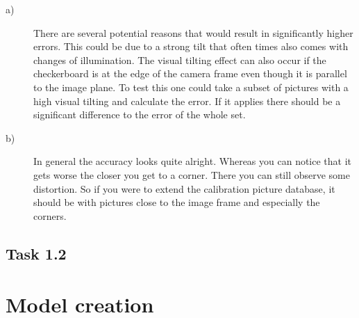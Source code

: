 \documentclass[a4paper]{article} %
\begin{document}
    \begin{description}
        \item [a)] There are several potential reasons that would result in significantly higher errors.
                This could be due to a strong tilt that often times also comes with changes of illumination.
                The visual tilting effect can also occur if the checkerboard is at the edge of the camera frame even though it is parallel to the image plane.
                To test this one could take a subset of pictures with a high visual tilting and calculate the error.
                If it applies there should be a significant difference to the error of the whole set.
        \item [b)] In general the accuracy looks quite alright.
                Whereas you can notice that it gets worse the closer you get to a corner.
                There you can still observe some distortion. 
                So if you were to extend the calibration picture database, it should be with pictures close to the image frame and especially the corners.
    \end{description}

    \subsection*{Task 1.2}

\section{Model creation}
\end{document}
